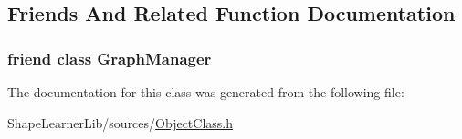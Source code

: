 \subsection{Friends And Related Function Documentation}
\hypertarget{class_object_class_1_1_access_a4f73c83d7340dc64ca31fa4fdf2ab4b8}{}
\subsubsection[{Graph\+Manager}]{\setlength{\rightskip}{0pt plus 5cm}friend class {\bf Graph\+Manager}\hspace{0.3cm}{\ttfamily [friend]}}\label{class_object_class_1_1_access_a4f73c83d7340dc64ca31fa4fdf2ab4b8}


The documentation for this class was generated from the following file\+:\begin{DoxyCompactItemize}
\item 
Shape\+Learner\+Lib/sources/\hyperlink{_object_class_8h}{Object\+Class.\+h}\end{DoxyCompactItemize}
